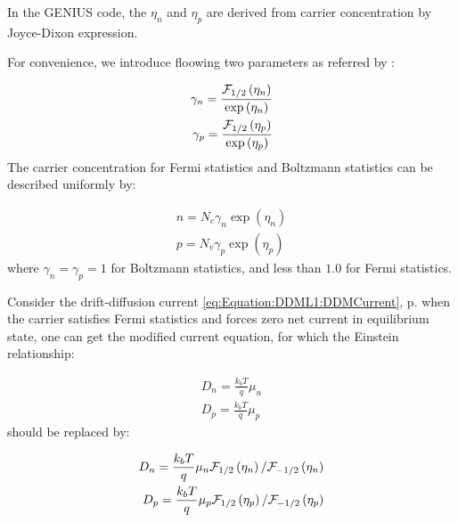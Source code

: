 \documentclass[oneside,12pt]{cgd_book}
\begin{document}
In the GENIUS code, the $\eta _n$ and $\eta _p$ are
      derived from carrier concentration by Joyce-Dixon expression.
\par
For convenience, we introduce floowing two parameters as referred by
\cite[SEDAN1985]{}:
\par
\begin{subequations}
\begin{align}
 \gamma_n = \frac{ {\cal F}_{1/2} \left( \eta_n \right) } { \exp \left( \eta _n \right) }  \\
 \gamma_p = \frac{ {\cal F}_{1/2} \left( \eta_p \right) } { \exp \left( \eta _p \right) }
\end{align}
\end{subequations}
The carrier concentration for Fermi statistics and Boltzmann statistics can be described uniformly
      by:
\par
\begin{subequations}
\begin{align}
 n = N_c \gamma_n \exp \left( \eta _n \right) \\
 p = N_v \gamma_p \exp \left( \eta _p \right)
\end{align}
\end{subequations}
where $\gamma_n=\gamma_p=1$ for Boltzmann statistics, and less than
$1.0$ for Fermi statistics.
\par
{}Consider the drift-diffusion current
\eqref{eq:Equation:DDML1:DDMCurrent}, p. \pageref{eq:Equation:DDML1:DDMCurrent}
when the carrier
        satisfies Fermi statistics and forces zero net current in equilibrium state, one can get the modified current
        equation, for which the Einstein relationship:
\par
\par
\begin{subequations}
\begin{align}
 D_n = \frac{k_b T}{q} \mu_n \\
 D_p = \frac{k_b T}{q} \mu_p
\end{align}
\end{subequations}
should be replaced by:
\par
\begin{subequations}
\begin{align}
 D_n = \frac{k_b T}{q} \mu_n {\cal F}_{1/2} \left( \eta_n \right)/{\cal F}_{-1/2} \left(
        \eta_n \right) \\
 D_p = \frac{k_b T}{q} \mu_p {\cal F}_{1/2} \left( \eta _p \right)/{\cal F}_{-1/2} \left(
        \eta_p \right)
\end{align}
\end{subequations}
\end{document}
